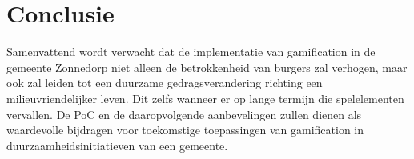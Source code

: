 \documentclass{hogent-article}
\begin{document}
\section{Conclusie}%
\label{sec:discussie-conclusie}

Samenvattend wordt verwacht dat de implementatie van gamification in de gemeente Zonnedorp niet alleen de betrokkenheid van burgers zal verhogen, maar ook zal leiden tot een duurzame gedragsverandering richting een milieuvriendelijker leven. Dit zelfs wanneer er op lange termijn die spelelementen vervallen.  De PoC en de daaropvolgende aanbevelingen zullen dienen als waardevolle bijdragen voor toekomstige toepassingen van gamification in duurzaamheidsinitiatieven van een gemeente.

\printbibliography[heading=bibintoc]
\end{document}

